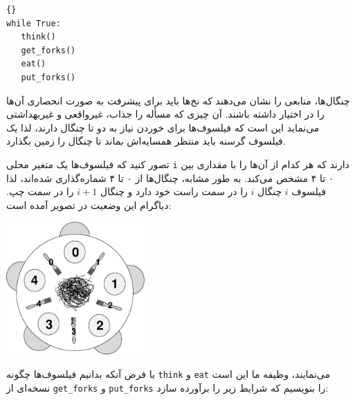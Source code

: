 \documentclass{book}
\begin{document}
\begin{latin}
\begin{lstlisting}[title=\rl{حلقه پایه فیلسوف}]{}
while True:
   think()
   get_forks()
   eat()
   put_forks()
\end{lstlisting}
\end{latin}

    چنگال‌ها، منابعی را نشان می‌دهند که نخ‌ها باید برای پیشرفت به صورت انحصاری آن‌ها را در اختیار داشته باشند.
    آن چیزی که مسأله را جذاب، غیرواقعی و غیربهداشتی می‌نماید این است که فیلسوف‌ها برای  خوردن نیاز به دو تا چنگال دارند، لذا 
    یک فیلسوف گرسنه باید منتظر همسایه‌اش بماند تا چنگال را زمین بگذارد. 

    تصور کنید که فیلسوف‌ها یک متغیر محلی {\tt i} دارند که هر کدام  از آن‌ها را با مقداری بین ۰ تا ۴ مشخص می‌کند. 
    به طور مشابه، چنگال‌ها از ۰ تا ۴ شماره‌گذاری شده‌اند، لذا فیلسوف $i$ چنگال $i$ را در سمت راست خود دارد و چنگال  $i+1$  را در سمت چپ.
    دیاگرام این وضعیت در تصویر آمده است: 

\centerline{\includegraphics[height=2in]{table.eps}}

    با فرض آنکه بدانیم فیلسوف‌ها چگونه {\tt think} و {\tt eat} می‌نمایند، وظیفه ما این است نسخه‌ای از {\tt get\_forks} و {\tt put\_forks}
    را بنویسیم که شرایط زیر را برآورده سازد:
\end{document}

